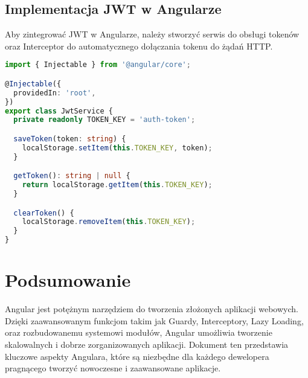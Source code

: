 \documentclass[a4paper,12pt]{article}
\begin{document}
\subsection{Implementacja JWT w Angularze}
Aby zintegrować JWT w Angularze, należy stworzyć serwis do obsługi tokenów oraz Interceptor do automatycznego dołączania tokenu do żądań HTTP.

\begin{lstlisting}[language=TypeScript, caption=Przykład serwisu do obsługi JWT]
import { Injectable } from '@angular/core';

@Injectable({
  providedIn: 'root',
})
export class JwtService {
  private readonly TOKEN_KEY = 'auth-token';

  saveToken(token: string) {
    localStorage.setItem(this.TOKEN_KEY, token);
  }

  getToken(): string | null {
    return localStorage.getItem(this.TOKEN_KEY);
  }

  clearToken() {
    localStorage.removeItem(this.TOKEN_KEY);
  }
}
\end{lstlisting}

\section{Podsumowanie}
Angular jest potężnym narzędziem do tworzenia złożonych aplikacji webowych. Dzięki zaawansowanym funkcjom takim jak Guardy, Interceptory, Lazy Loading, oraz rozbudowanemu systemowi modułów, Angular umożliwia tworzenie skalowalnych i dobrze zorganizowanych aplikacji. Dokument ten przedstawia kluczowe aspekty Angulara, które są niezbędne dla każdego dewelopera pragnącego tworzyć nowoczesne i zaawansowane aplikacje.
\end{document}
